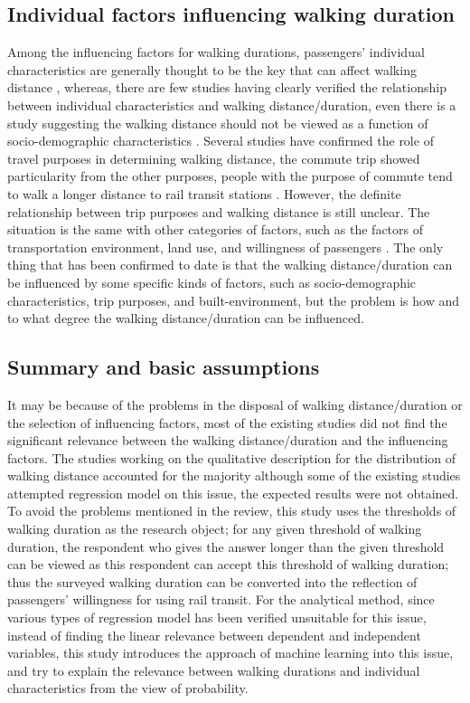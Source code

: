 \documentclass[sustainability,article,submit,moreauthors,pdftex,10pt,a4paper]{Definitions/mdpi}
\begin{document}
\subsection{Individual factors influencing walking duration}
%
Among the influencing factors for walking durations, passengers' individual characteristics are generally thought to be the key that can affect walking distance \cite{besser2005walking,weinstein2008far,krygsman2004multimodal,yang2012walking,daniels2013explaining,guerra2012half}, whereas, there are few studies having clearly verified the relationship between individual characteristics and walking distance/duration, even there is a study suggesting the walking distance should not be viewed as a function of socio-demographic characteristics \cite{krygsman2004multimodal}. Several studies have confirmed the role of travel purposes in determining walking distance, the commute trip showed particularity from the other purposes, people with the purpose of commute tend to walk a longer distance to rail transit stations \cite{larsen2010beyond}. However, the definite relationship between trip purposes and walking distance is still unclear. The situation is the same with other categories of factors, such as the factors of transportation environment, land use, and willingness of passengers \cite{guerra2012half,krygsman2004multimodal,weinstein2008far}. The only thing that has been confirmed to date is that the walking distance/duration can be influenced by some specific kinds of factors, such as socio-demographic characteristics, trip purposes, and built-environment, but the problem is how and to what degree the walking distance/duration can be influenced.

%
\subsection{Summary and basic assumptions}
%
It may be because of the problems in the disposal of walking distance/duration or the selection of influencing factors, most of the existing studies did not find the significant relevance between the walking distance/duration and the influencing factors. The studies working on the qualitative description for the distribution of walking distance accounted for the majority although some of the existing studies attempted regression model on this issue, the expected results were not obtained. To avoid the problems mentioned in the review, this study uses the thresholds of walking duration as the research object; for any given threshold of walking duration, the respondent who gives the answer longer than the given threshold can be viewed as this respondent can accept this threshold of walking duration; thus the surveyed walking duration can be converted into the reflection of passengers' willingness for using rail transit. For the analytical method, since various types of regression model has been verified unsuitable for this issue, instead of finding the linear relevance between dependent and independent variables, this study introduces the approach of machine learning into this issue, and try to explain the relevance between walking durations and individual characteristics from the view of probability.
\end{document}
